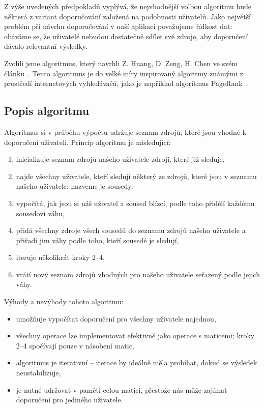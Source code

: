 Z výše uvedených předpokladů vyplývá, že nejvhodnější volbou algoritmu bude některá z variant doporučování založená na podobnosti uživatelů.
Jako největší problém při návrhu doporučování v naší aplikaci považujeme řídkost dat: obáváme se, že uživatelé nebudou dostatečně sdílet své zdroje, aby doporučení dávalo relevantní výsledky.

Zvolili jsme algoritmus, který navrhli Z. Huang, D. Zeng, H. Chen ve svém článku~\cite{huang2004link}.
Tento algoritmus je do velké míry inspirovaný algoritmy známými z prostředí internetových vyhledávačů, jako je například algoritmus PageRank~\cite{page1999pagerank}.

\subsection{Popis algoritmu}

Algoritmus si v průběhu výpočtu udržuje seznam zdrojů, které jsou vhodné k doporučení uživateli.
Princip algoritmu je následující:
\begin{enumerate}
    \item inicializuje seznam zdrojů našeho uživatele zdroji, které již sleduje,
    \item najde všechny uživatele, kteří sledují některý ze zdrojů, které jsou v seznamu našeho uživatele: nazveme je sousedy,
    \item vypočítá, jak jsou si náš uživatel a soused blízcí, podle toho přidělí každému sousedovi váhu,
    \item přidá všechny zdroje všech sousedů do seznamu zdrojů našeho uživatele a přiřadí jim váhy podle toho, kteří sousedé je sledují,
    \item iteruje několikrát kroky 2--4,
    \item vrátí nový seznam zdrojů vhodných pro našeho uživatele seřazený podle jejich váhy.
\end{enumerate}

Výhody a nevýhody tohoto algoritmu:
\def\proitem{\item[$\boldsymbol{+}$]}
\def\conitem{\item[$\boldsymbol{-}$]}
\begin{itemize}
    \proitem umožňuje vypočítat doporučení pro všechny uživatele najednou,
    \proitem všechny operace lze implementovat efektivně jako operace s maticemi; kroky 2--4 spočívají pouze v násobení matic,
	\conitem algoritmus je iterativní -- iterace by ideálně měla probíhat, dokud se výsledek neustabilizuje,
	\conitem je nutné udržovat v paměti celou matici, přestože nás může zajímat doporučení pro jediného uživatele.
\end{itemize}

